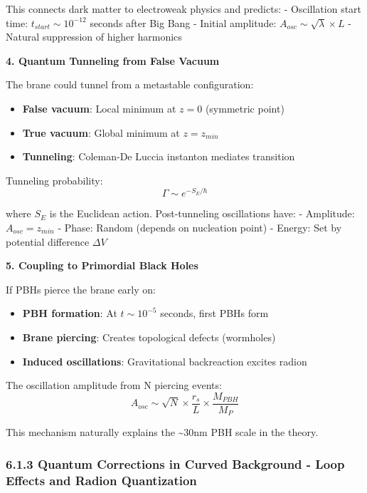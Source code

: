 \documentclass[
  11pt,
]{report}
\providecommand{\tightlist}{%
  \setlength{\itemsep}{0pt}\setlength{\parskip}{0pt}}
\begin{document}
This connects dark matter to electroweak physics and predicts: -
Oscillation start time: \(t_{start} \sim 10^{-12}\) seconds after Big
Bang - Initial amplitude: \(A_{osc} \sim \sqrt{\lambda} \times L\) -
Natural suppression of higher harmonics

\textbf{4. Quantum Tunneling from False Vacuum}

The brane could tunnel from a metastable configuration:

\begin{itemize}
\tightlist
\item
  \textbf{False vacuum}: Local minimum at \(z = 0\) (symmetric point)
\item
  \textbf{True vacuum}: Global minimum at \(z = z_{min}\)
\item
  \textbf{Tunneling}: Coleman-De Luccia instanton mediates transition
\end{itemize}

Tunneling probability: \[\Gamma \sim e^{-S_E/\hbar}\]

where \(S_E\) is the Euclidean action. Post-tunneling oscillations have:
- Amplitude: \(A_{osc} = z_{min}\) - Phase: Random (depends on
nucleation point) - Energy: Set by potential difference \(\Delta V\)

\textbf{5. Coupling to Primordial Black Holes}

If PBHs pierce the brane early on:

\begin{itemize}
\tightlist
\item
  \textbf{PBH formation}: At \(t \sim 10^{-5}\) seconds, first PBHs form
\item
  \textbf{Brane piercing}: Creates topological defects (wormholes)
\item
  \textbf{Induced oscillations}: Gravitational backreaction excites
  radion
\end{itemize}

The oscillation amplitude from N piercing events:
\[A_{osc} \sim \sqrt{N} \times \frac{r_s}{L} \times \frac{M_{PBH}}{M_P}\]

This mechanism naturally explains the \textasciitilde30nm PBH scale in
the theory.

\subsubsection{6.1.3 Quantum Corrections in Curved Background - Loop
Effects and Radion
Quantization}\label{quantum-corrections-in-curved-background---loop-effects-and-radion-quantization}
\end{document}
